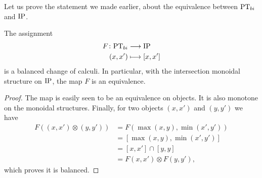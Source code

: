 
Let us prove the statement we made earlier, about the equivalence between $\mathrm{PT}_{bi}$ and $\mathrm{IP}$. 

\begin{lemma}
    The assignment 
    \begin{align*}
        F \colon \mathrm{PT}_{bi} &\longrightarrow \mathrm{IP} \\
        (x,x') &\longmapsto [x,x']
    \end{align*}
    is a balanced change of calculi. In particular, with the intersection monoidal structure on $\mathrm{IP}$, the map $F$ is an equivalence. 
\end{lemma}
\begin{proof}
    The map is easily seen to be an equivalence on objects. It is also monotone on the monoidal structures. Finally, for two objects $(x, x')$ and $(y, y')$ we have 
    \begin{align*}
        F((x, x')\otimes (y, y')) 
        &= F(\max(x, y), \min(x',y')) \\
        &= [\max(x, y), \min(x',y')] \\
        &= [x, x']\cap [y, y] \\
        &= F(x, x')\otimes F(y, y'),
    \end{align*}
    which proves it is balanced. 
\end{proof}

